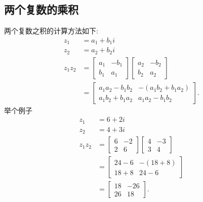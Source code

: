 \subsection{两个复数的乘积}
两个复数之积的计算方法如下:
$$
  \begin{aligned}
    z_{1}       & =a_{1}+b_{1} i                                                                  \\
    z_{2}       & =a_{2}+b_{2} i                                                                  \\
    z_{1} z_{2} & =\left[\begin{array}{cc}
        a_{1} & -b_{1} \\
        b_{1} & a_{1}
      \end{array}\right]\left[\begin{array}{cc}
        a_{2} & -b_{2} \\
        b_{2} & a_{2}
      \end{array}\right] \\
                & =\left[\begin{array}{cc}
        a_{1} a_{2}-b_{1} b_{2} & -\left(a_{1} b_{2}+b_{1} a_{2}\right) \\
        a_{1} b_{2}+b_{1} a_{2} & a_{1} a_{2}-b_{1} b_{2}
      \end{array}\right] .
  \end{aligned}
$$
举个例子
$$
  \begin{aligned}
    z_{1}       & =6+2 i                                                                          \\
    z_{2}       & =4+3 i                                                                          \\
    z_{1} z_{2} & =\left[\begin{array}{cc}
        6 & -2 \\
        2 & 6
      \end{array}\right]\left[\begin{array}{cc}
        4 & -3 \\
        3 & 4
      \end{array}\right] \\
                & =\left[\begin{array}{cc}
        24-6 & -(18+8) \\
        18+8 & 24-6
      \end{array}\right]                                        \\
                & =\left[\begin{array}{cc}
        18 & -26 \\
        26 & 18
      \end{array}\right] .
  \end{aligned}
$$

